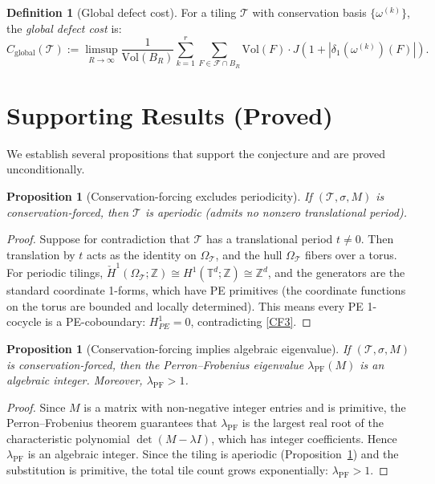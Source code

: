 \documentclass[12pt]{article}
\newtheorem{proposition}[theorem]{Proposition}
\theoremstyle{definition}
\newtheorem{definition}[theorem]{Definition}
\theoremstyle{remark}
\newcommand{\ZZ}{\mathbb{Z}}
\newcommand{\Hcech}{\check{H}}
\DeclareMathOperator{\PF}{PF}
\begin{document}
\begin{definition}[Global defect cost]
\label{def:global-cost}
For a tiling $\mathcal{T}$ with conservation basis $\{\omega^{(k)}\}$, the \emph{global defect cost} is:
\[
C_{\mathrm{global}}(\mathcal{T}) := \limsup_{R \to \infty} \frac{1}{\mathrm{Vol}(B_R)} \sum_{k=1}^r \sum_{F \in \mathcal{F} \cap B_R} \mathrm{Vol}(F) \cdot J\!\left(1 + |\delta_1(\omega^{(k)})(F)|\right).
\]
\end{definition}


\section{Supporting Results (Proved)}
\label{sec:proved}

We establish several propositions that support the conjecture and are proved unconditionally.

\begin{proposition}[Conservation-forcing excludes periodicity]
\label{prop:aperiodic}
If $(\mathcal{T}, \sigma, M)$ is conservation-forced, then $\mathcal{T}$ is aperiodic (admits no nonzero translational period).
\end{proposition}

\begin{proof}
Suppose for contradiction that $\mathcal{T}$ has a translational period $t \neq 0$. Then translation by $t$ acts as the identity on $\Omega_{\mathcal{T}}$, and the hull $\Omega_{\mathcal{T}}$ fibers over a torus. For periodic tilings, $\Hcech^1(\Omega_{\mathcal{T}}; \ZZ) \cong H^1(\mathbb{T}^d; \ZZ) \cong \ZZ^d$, and the generators are the standard coordinate 1-forms, which have PE primitives (the coordinate functions on the torus are bounded and locally determined). This means every PE 1-cocycle is a PE-coboundary: $H^1_{PE} = 0$, contradicting \ref{CF3}.
\end{proof}

\begin{proposition}[Conservation-forcing implies algebraic eigenvalue]
\label{prop:algebraic}
If $(\mathcal{T}, \sigma, M)$ is conservation-forced, then the Perron--Frobenius eigenvalue $\lambda_\PF(M)$ is an algebraic integer. Moreover, $\lambda_\PF > 1$.
\end{proposition}

\begin{proof}
Since $M$ is a matrix with non-negative integer entries and is primitive, the Perron--Frobenius theorem guarantees that $\lambda_\PF$ is the largest real root of the characteristic polynomial $\det(M - \lambda I)$, which has integer coefficients. Hence $\lambda_\PF$ is an algebraic integer. Since the tiling is aperiodic (Proposition~\ref{prop:aperiodic}) and the substitution is primitive, the total tile count grows exponentially: $\lambda_\PF > 1$.
\end{proof}
\end{document}
